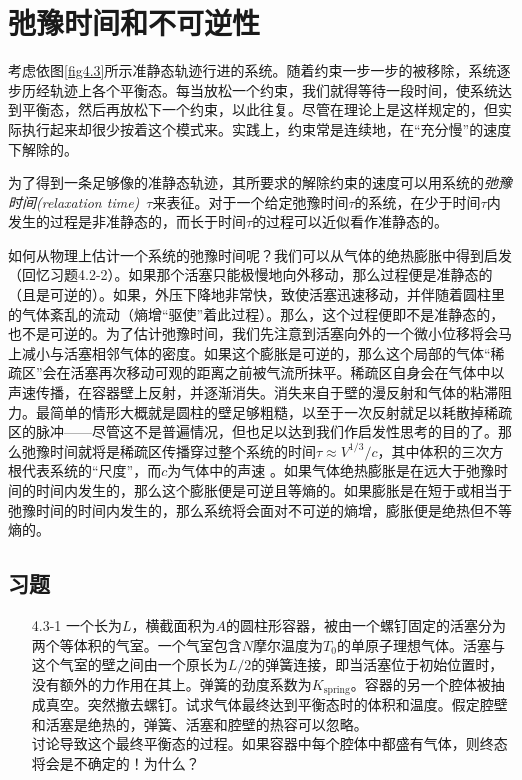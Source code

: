 \section{弛豫时间和不可逆性}\label{sec4.3}
考虑依图\ref{fig4.3}所示准静态轨迹行进的系统。随着约束一步一步的被移除，系统逐步历经轨迹上各个平衡态。每当放松一个约束，我们就得等待一段时间，使系统达到平衡态，然后再放松下一个约束，以此往复。尽管在理论上是这样规定的，但实际执行起来却很少按着这个模式来。实践上，约束常是连续地，在“充分慢”的速度下解除的。

为了得到一条足够像的准静态轨迹，其所要求的解除约束的速度可以用系统的{\it 弛豫时间(relaxation time)}\, $\tau$来表征。对于一个给定弛豫时间$\tau$的系统，在少于时间$\tau$内发生的过程是非准静态的，而长于时间$\tau$的过程可以近似看作准静态的。

如何从物理上估计一个系统的弛豫时间呢？我们可以从气体的绝热膨胀中得到启发（回忆习题4.2-2）。如果那个活塞只能极慢地向外移动，那么过程便是准静态的（且是可逆的）。如果，外压下降地非常快，致使活塞迅速移动，并伴随着圆柱里的气体紊乱的流动（熵增“驱使”着此过程）。那么，这个过程便即不是准静态的，也不是可逆的。为了估计弛豫时间，我们先注意到活塞向外的一个微小位移将会马上减小与活塞相邻气体的密度。如果这个膨胀是可逆的，那么这个局部的气体“稀疏区”会在活塞再次移动可观的距离之前被气流所抹平。稀疏区自身会在气体中以声速传播，在容器壁上反射，并逐渐消失。消失来自于壁的漫反射和气体的粘滞阻力。最简单的情形大概就是圆柱的壁足够粗糙，以至于一次反射就足以耗散掉稀疏区的脉冲——尽管这不是普遍情况，但也足以达到我们作启发性思考的目的了。那么弛豫时间就将是稀疏区传播穿过整个系统的时间$\tau\approx V^{1/3}/c$，其中体积的三次方根代表系统的“尺度”，而$c$为气体中的声速%
%
。如果气体绝热膨胀是在远大于弛豫时间的时间内发生的，那么这个膨胀便是可逆且等熵的。如果膨胀是在短于或相当于弛豫时间的时间内发生的，那么系统将会面对不可逆的熵增，膨胀便是绝热但不等熵的。

\subsection*{习题}
\begin{itemize}
\item[4.3-1] 一个长为$L$，横截面积为$A$的圆柱形容器，被由一个螺钉固定的活塞分为两个等体积的气室。一个气室包含$N$摩尔温度为$T_0$的单原子理想气体。活塞与这个气室的壁之间由一个原长为$L/2$的弹簧连接，即当活塞位于初始位置时，没有额外的力作用在其上。弹簧的劲度系数为$K_\text{spring}$。容器的另一个腔体被抽成真空。突然撤去螺钉。试求气体最终达到平衡态时的体积和温度。假定腔壁和活塞是绝热的，弹簧、活塞和腔壁的热容可以忽略。\\
讨论导致这个最终平衡态的过程。如果容器中每个腔体中都盛有气体，则终态将会是不确定的！为什么？
\end{itemize}

